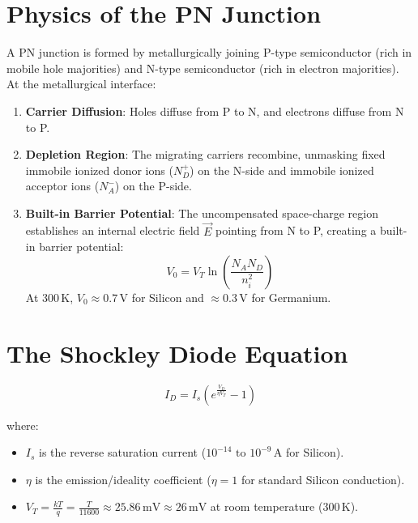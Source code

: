 \section{Physics of the PN Junction}
A PN junction is formed by metallurgically joining P-type semiconductor (rich in mobile hole majorities) and N-type semiconductor (rich in electron majorities). At the metallurgical interface:
\begin{enumerate}
    \item \textbf{Carrier Diffusion}: Holes diffuse from P to N, and electrons diffuse from N to P.
    \item \textbf{Depletion Region}: The migrating carriers recombine, unmasking fixed immobile ionized donor ions ($N_D^+$) on the N-side and immobile ionized acceptor ions ($N_A^-$) on the P-side.
    \item \textbf{Built-in Barrier Potential}: The uncompensated space-charge region establishes an internal electric field $\vec{E}$ pointing from N to P, creating a built-in barrier potential:
    \[ V_0 = V_T \ln\left( \frac{N_A N_D}{n_i^2} \right) \]
    At $300\,\mathrm{K}$, $V_0 \approx 0.7\,\mathrm{V}$ for Silicon and $\approx 0.3\,\mathrm{V}$ for Germanium.
\end{enumerate}

\section{The Shockley Diode Equation}
\begin{keyequation}
\[ I_D = I_s \left( e^{\frac{V_D}{\eta V_T}} - 1 \right) \]
\end{keyequation}
where:
\begin{itemize}
    \item $I_s$ is the reverse saturation current ($10^{-14}\text{ to } 10^{-9}\,\mathrm{A}$ for Silicon).
    \item $\eta$ is the emission/ideality coefficient ($\eta = 1$ for standard Silicon conduction).
    \item $V_T = \frac{kT}{q} = \frac{T}{11600} \approx 25.86\,\mathrm{mV} \approx 26\,\mathrm{mV}$ at room temperature ($300\,\mathrm{K}$).
\end{itemize}


